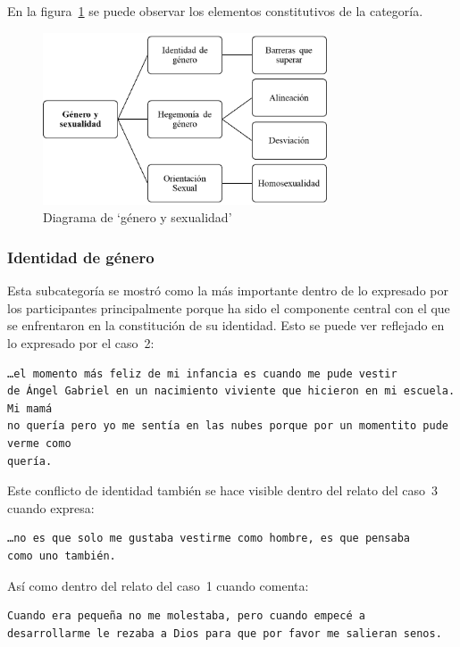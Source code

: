 En la figura~\ref{fig:genero} se puede observar los elementos constitutivos de
la categoría.

\begin{figure}
    \centering
    \includegraphics[width=0.75\textwidth]{genero}
    \caption{Diagrama de ‘género y sexualidad’}\label{fig:genero}
\end{figure}

\subsubsection{Identidad de género}

Esta subcategoría se mostró como la más importante dentro de lo expresado por
los participantes principalmente porque ha sido el componente central con
el que se enfrentaron en la constitución de su identidad. Esto se puede ver
reflejado en lo expresado por el caso~2:

\begin{verbatim}
…el momento más feliz de mi infancia es cuando me pude vestir
de Ángel Gabriel en un nacimiento viviente que hicieron en mi escuela. Mi mamá
no quería pero yo me sentía en las nubes porque por un momentito pude verme como
quería.
\end{verbatim}

Este conflicto de identidad también se hace visible dentro del relato del caso~3
cuando expresa:

\begin{verbatim}
…no es que solo me gustaba vestirme como hombre, es que pensaba
como uno también.
\end{verbatim}

Así como dentro del relato del caso~1 cuando comenta:

\begin{verbatim}
Cuando era pequeña no me molestaba, pero cuando empecé a
desarrollarme le rezaba a Dios para que por favor me salieran senos.
\end{verbatim}

